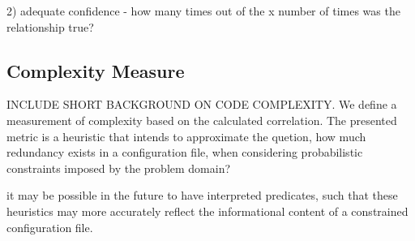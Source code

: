 2) adequate confidence - how many times out of the x number of times was the relationship true?

\iffalse
- Open Questions
> What is the difference between {\it important} rules and
  {\it rules we are more sure about}?

> Why doesn't everything just sum to zero?

\fi
\subsection{Complexity Measure}

INCLUDE SHORT BACKGROUND ON CODE COMPLEXITY. We define a measurement
of complexity based on the calculated correlation. The presented
metric is a heuristic that intends to approximate the quetion, 
 how much redundancy exists in a configuration file, when considering
probabilistic constraints imposed by the problem domain?

it may be possible in the future to have interpreted predicates,
such that these heuristics may more accurately reflect the informational
content of a constrained configuration file.




